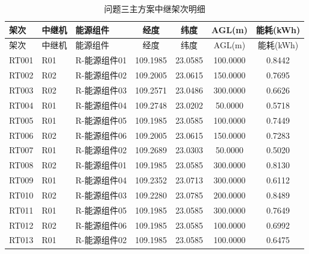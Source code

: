 ﻿\begin{center}\small
\begin{longtable}{lllcccc}
\caption{问题三主方案中继架次明细}\label{app:q3_relay}\\
\hline 架次 & 中继机 & 能源组件 & 经度 & 纬度 & AGL(m) & 能耗(kWh) \\\hline\endfirsthead
\hline 架次 & 中继机 & 能源组件 & 经度 & 纬度 & AGL(m) & 能耗(kWh) \\\hline\endhead
RT001 & R01 & R-能源组件01 & 109.1985 & 23.0585 & 100.0000 & 0.8442 \\
RT002 & R02 & R-能源组件02 & 109.2005 & 23.0615 & 150.0000 & 0.7695 \\
RT003 & R02 & R-能源组件03 & 109.2571 & 23.0486 & 300.0000 & 0.6626 \\
RT004 & R01 & R-能源组件04 & 109.2748 & 23.0202 & 50.0000 & 0.5718 \\
RT005 & R01 & R-能源组件05 & 109.1985 & 23.0585 & 100.0000 & 0.7449 \\
RT006 & R02 & R-能源组件06 & 109.2005 & 23.0615 & 150.0000 & 0.7283 \\
RT007 & R01 & R-能源组件02 & 109.2689 & 23.0303 & 50.0000 & 0.5020 \\
RT008 & R02 & R-能源组件01 & 109.1985 & 23.0585 & 300.0000 & 0.8130 \\
RT009 & R01 & R-能源组件04 & 109.2352 & 23.0713 & 300.0000 & 0.6112 \\
RT010 & R02 & R-能源组件03 & 109.2280 & 23.0785 & 200.0000 & 0.8489 \\
RT011 & R01 & R-能源组件05 & 109.1985 & 23.0585 & 300.0000 & 0.7649 \\
RT012 & R02 & R-能源组件06 & 109.1985 & 23.0585 & 100.0000 & 0.6992 \\
RT013 & R01 & R-能源组件02 & 109.1985 & 23.0585 & 100.0000 & 0.6475 \\
\hline\end{longtable}\end{center}
